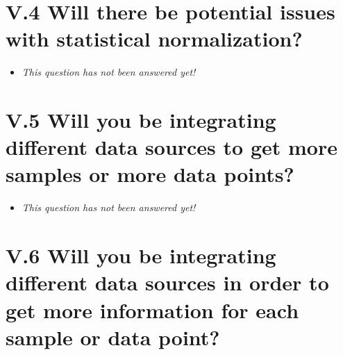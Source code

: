 \documentclass[a4paper,12pt]{report}
\begin{document}
\section*{\protect\textcolor{colorSecId}{V.4} Will there be potential issues with statistical normalization?}

\label{83438863-0aa0-4458-b14b-2b2c0d4f811d.d0306914-c253-472c-869f-19a60578c087}






\begin{itemize}
  \item[\XSolidBrush] \textit{This question has not been answered yet!}
\end{itemize}
  


\section*{\protect\textcolor{colorSecId}{V.5} Will you be integrating different data sources to get more samples or more data points?}

\label{83438863-0aa0-4458-b14b-2b2c0d4f811d.dbb6dcdf-dd2e-4829-8c03-16b2339ebd5a}






\begin{itemize}
  \item[\XSolidBrush] \textit{This question has not been answered yet!}
\end{itemize}
  


\section*{\protect\textcolor{colorSecId}{V.6} Will you be integrating different data sources in order to get more information for each sample or data point?}

\label{83438863-0aa0-4458-b14b-2b2c0d4f811d.d5d21ad3-720c-4a6a-bd5a-09f14b15666f}
\end{document}
